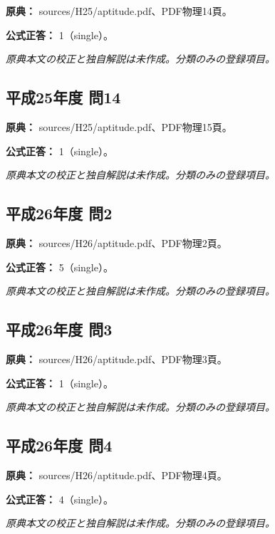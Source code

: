 \noindent\textbf{原典：} sources/H25/aptitude.pdf、PDF物理14頁。

\textbf{公式正答：} 1（single）。

\par\textit{原典本文の校正と独自解説は未作成。分類のみの登録項目。}

\subsection{平成25年度 問14}
\label{q:h25-reg-apt-14}

\noindent\textbf{原典：} sources/H25/aptitude.pdf、PDF物理15頁。

\textbf{公式正答：} 1（single）。

\par\textit{原典本文の校正と独自解説は未作成。分類のみの登録項目。}

\subsection{平成26年度 問2}
\label{q:h26-reg-apt-02}

\noindent\textbf{原典：} sources/H26/aptitude.pdf、PDF物理2頁。

\textbf{公式正答：} 5（single）。

\par\textit{原典本文の校正と独自解説は未作成。分類のみの登録項目。}

\subsection{平成26年度 問3}
\label{q:h26-reg-apt-03}

\noindent\textbf{原典：} sources/H26/aptitude.pdf、PDF物理3頁。

\textbf{公式正答：} 1（single）。

\par\textit{原典本文の校正と独自解説は未作成。分類のみの登録項目。}

\subsection{平成26年度 問4}
\label{q:h26-reg-apt-04}

\noindent\textbf{原典：} sources/H26/aptitude.pdf、PDF物理4頁。

\textbf{公式正答：} 4（single）。

\par\textit{原典本文の校正と独自解説は未作成。分類のみの登録項目。}

